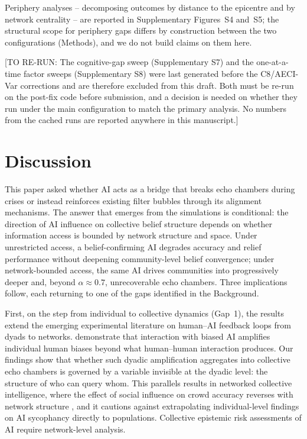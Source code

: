 \documentclass[pdflatex,sn-basic]{sn-jnl}
\begin{document}
Periphery analyses -- decomposing outcomes by distance to the epicentre and by network centrality -- are reported in Supplementary Figures~S4 and~S5; the structural scope for periphery gaps differs by construction between the two configurations (Methods), and we do not build claims on them here.

[TO RE-RUN: The cognitive-gap sweep (Supplementary S7) and the one-at-a-time factor sweeps (Supplementary S8) were last generated before the C8/AECI-Var corrections and are therefore excluded from this draft. Both must be re-run on the post-fix code before submission, and a decision is needed on whether they run under the main configuration to match the primary analysis. No numbers from the cached runs are reported anywhere in this manuscript.]

\section{Discussion}\label{sec:discussion}

This paper asked whether AI acts as a bridge that breaks echo chambers during crises or instead reinforces existing filter bubbles through its alignment mechanisms. The answer that emerges from the simulations is conditional: the direction of AI influence on collective belief structure depends on whether information access is bounded by network structure and space. Under unrestricted access, a belief-confirming AI degrades accuracy and relief performance without deepening community-level belief convergence; under network-bounded access, the same AI drives communities into progressively deeper and, beyond $\alpha \approx 0.7$, unrecoverable echo chambers. Three implications follow, each returning to one of the gaps identified in the Background.

First, on the step from individual to collective dynamics (Gap~1), the results extend the emerging experimental literature on human--AI feedback loops from dyads to networks. \citet{glickman2024human} demonstrate that interaction with biased AI amplifies individual human biases beyond what human--human interaction produces. Our findings show that whether such dyadic amplification aggregates into collective echo chambers is governed by a variable invisible at the dyadic level: the structure of who can query whom. This parallels results in networked collective intelligence, where the effect of social influence on crowd accuracy reverses with network structure \citep{lorenz2011social,becker2017network}, and it cautions against extrapolating individual-level findings on AI sycophancy \citep{sharma2024generative} directly to populations. Collective epistemic risk assessments of AI require network-level analysis.
\end{document}
